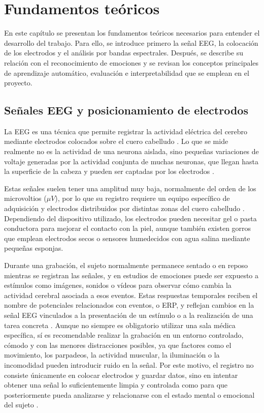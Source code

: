 
\chapter{Fundamentos teóricos}
\label{cap:capitulo3}



En este capítulo se presentan los fundamentos teóricos necesarios para entender el desarrollo del trabajo. Para ello, se introduce primero la señal \ac{EEG}, la colocación de los electrodos y el análisis por bandas espectrales. Después, se describe su relación con el reconocimiento de emociones y se revisan los conceptos principales de aprendizaje automático, evaluación e interpretabilidad que se emplean en el proyecto.


\section{Señales EEG y posicionamiento de electrodos}

La \ac{EEG} es una técnica que permite registrar la actividad eléctrica del cerebro mediante electrodos colocados sobre el cuero cabelludo \cite{mayo2024eeg,alarcao2019eeg}. Lo que se mide realmente no es la actividad de una neurona aislada, sino pequeñas variaciones de voltaje generadas por la actividad conjunta de muchas neuronas, que llegan hasta la superficie de la cabeza y pueden ser captadas por los electrodos \cite{alarcao2019eeg}.


Estas señales suelen tener una amplitud muy baja, normalmente del orden de los microvoltios (\(\mu V\)), por lo que su registro requiere un equipo específico de adquisición y electrodos distribuidos por distintas zonas del cuero cabelludo \cite{alarcao2019eeg}. Dependiendo del dispositivo utilizado, los electrodos pueden necesitar gel o pasta conductora para mejorar el contacto con la piel, aunque también existen gorros que emplean electrodos secos o sensores humedecidos con agua salina mediante pequeñas esponjas.

Durante una grabación, el sujeto normalmente permanece sentado o en reposo mientras se registran las señales, y en estudios de emociones puede ser expuesto a estímulos como imágenes, sonidos o vídeos para observar cómo cambia la actividad cerebral asociada a esos eventos. Estas respuestas temporales reciben el nombre de potenciales relacionados con eventos, o \ac{ERP}, y reflejan cambios en la señal EEG vinculados a la presentación de un estímulo o a la realización de una tarea concreta \cite{luck2014erp}. Aunque no siempre es obligatorio utilizar una sala médica específica, sí es recomendable realizar la grabación en un entorno controlado, cómodo y con las menores distracciones posibles, ya que factores como el movimiento, los parpadeos, la actividad muscular, la iluminación o la incomodidad pueden introducir ruido en la señal. Por este motivo, el registro no consiste únicamente en colocar electrodos y guardar datos, sino en intentar obtener una señal lo suficientemente limpia y controlada como para que posteriormente pueda analizarse y relacionarse con el estado mental o emocional del sujeto \cite{alarcao2019eeg}.

